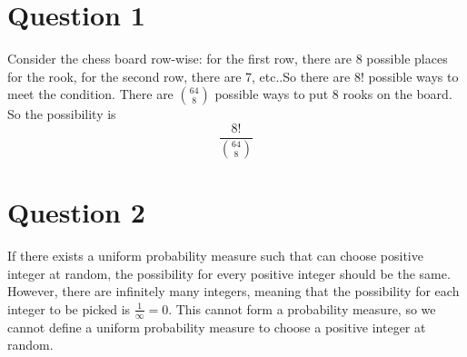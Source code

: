 \documentclass{article}
\begin{document}
\section*{Question 1}

Consider the chess board row-wise: for the first row, there are 8 possible places for the rook, for the second row, there are 7, etc..So there are $8!$ possible ways to meet the condition. There are $\binom{64}{8}$ possible ways to put 8 rooks on the board. So the possibility is \[\frac{8!}{\binom{64}{8}}\]

\section*{Question 2}

If there exists a uniform probability measure such that can choose positive integer at random, the possibility for every positive integer should be the same. However, there are infinitely many integers, meaning that the possibility for each integer to be picked is $\frac{1}{\infty}=0$. This cannot form a probability measure, so we cannot define a uniform probability measure to choose a positive integer at random.
\end{document}
